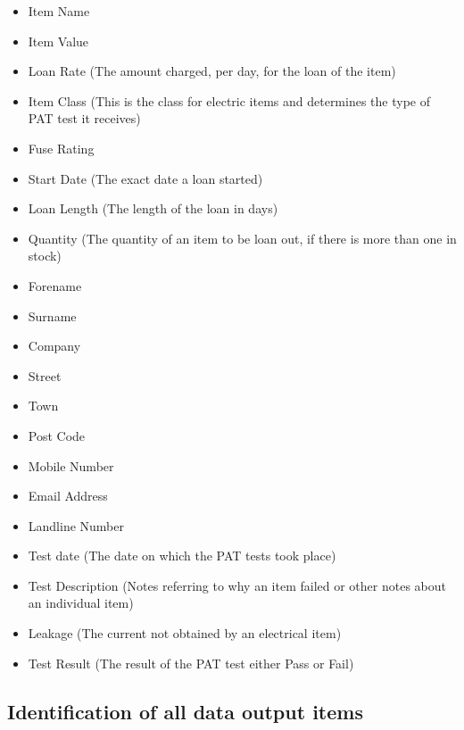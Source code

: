 \begin{itemize}
    \item Item Name
    \item Item Value
    \item Loan Rate (The amount charged, per day, for the loan of the item)
    \item Item Class (This is the class for electric items and determines the type of PAT test it receives)
    \item Fuse Rating\\ \hline
    \item Start Date (The exact date a loan started)
    \item Loan Length (The length of the loan in days)
    \item Quantity (The quantity of an item to be loan out, if there is more than one in stock)\\ \hline
    \item Forename
    \item Surname
    \item Company
    \item Street
    \item Town
    \item Post Code
    \item Mobile Number
    \item Email Address
    \item Landline Number\\ \hline
    \item Test date (The date on which the PAT tests took place)
    \item Test Description (Notes referring to why an item failed or other notes about an individual item)
    \item Leakage (The current not obtained by an electrical item)
    \item Test Result (The result of the PAT test either Pass or Fail)
\end{itemize}

\subsection{Identification of all data output items}


